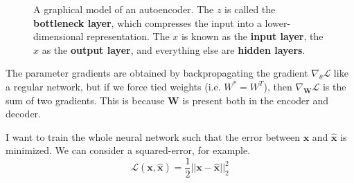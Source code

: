 \documentclass{article}
\begin{document}
\begin{definition}[Autoencoder]
\begin{figure}[H]
      \caption{A graphical model of an autoencoder. The $z$ is called the \textbf{bottleneck layer}, which compresses the input into a lower-dimensional representation. The $x$ is known as the \textbf{input layer}, the $\hat{x}$ as the \textbf{output layer}, and everything else are \textbf{hidden layers}.} 
      \label{fig:autoencoder}
    \end{figure}
  \end{definition}


  The parameter gradients are obtained by backpropagating the gradient $\nabla_{\theta} \mathcal{L}$ like a regular network, but if we force tied weights (i.e. $W^\ast = W^T$), then $\nabla_{\mathbf{W}} \mathcal{L}$ is the sum of two gradients. This is because $\mathbf{W}$ is present both in the encoder and decoder. 

  I want to train the whole neural network such that the error between $\mathbf{x}$ and $\hat{\mathbf{x}}$ is minimized. We can consider a squared-error, for example. 
  \begin{equation}
    \mathcal{L}(\mathbf{x}, \hat{\mathbf{x}}) = \frac{1}{2} ||\mathbf{x} - \hat{\mathbf{x}}||_2^2
  \end{equation}
\end{document}
